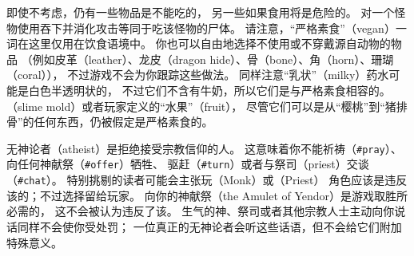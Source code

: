 \documentclass[a4paper, 10pt]{article}
\begin{document}
即使不考虑\zhTransConduct，仍有一些物品是不能吃的，
另一些如果食用将是危险的。
对一个怪物使用吞下并消化攻击等同于吃该怪物的尸体。
请注意，“严格素食”（vegan）一词在这里仅用在饮食语境中。
你也可以自由地选择不使用或不穿戴源自动物的物品
（例如皮革（leather）、龙皮（dragon hide）、骨（bone）、角（horn）、珊瑚（coral）），
不过游戏不会为你跟踪这些做法。
同样注意“乳状”（milky）药水可能是白色半透明状的，
不过它们不含有牛奶，所以它们是与严格素食相容的。
\zhTransSlimeMold（slime mold）或者玩家定义的“水果”（fruit），
尽管它们可以是从“樱桃”到“猪排骨”的任何东西，仍被假定是严格素食的。

无神论者（atheist）是拒绝接受宗教信仰的人。
这意味着你不能祈祷（{\tt \#pray}）、向任何神献祭（{\tt \#offer}）牺牲、
驱赶（{\tt \#turn}）\zhTransUndead{}或者与祭司（priest）交谈（{\tt \#chat}）。
特别挑剔的读者可能会主张玩\zhTransMonks（Monk）或\zhTransPriests（Priest）
角色应该是违反该\zhTransConduct{}的；不过选择留给玩家。
向你的神献祭\zhTransAmuletOfYendor（the Amulet of Yendor）是游戏取胜所必需的，
这不会被认为违反了该\zhTransConduct。
生气的神、祭司或者其他宗教人士主动向你说话同样不会使你受处罚；
一位真正的无神论者会听这些话语，但不会给它们附加特殊意义。
\end{document}
